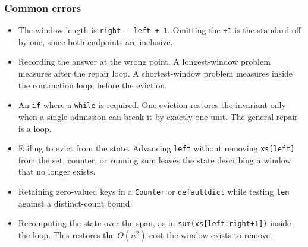 \vspace{-1ex}

\subsubsection*{Common errors}

\begin{itemize}[itemsep=-0.5ex]
  \item The window length is \texttt{right - left + 1}. Omitting the
        \texttt{+1} is the standard off-by-one, since both endpoints are
        inclusive.
  \item Recording the answer at the wrong point. A longest-window problem
        measures after the repair loop. A shortest-window problem measures
        inside the contraction loop, before the eviction.
  \item An \texttt{if} where a \texttt{while} is required. One eviction restores
        the invariant only when a single admission can break it by exactly one
        unit. The general repair is a loop.
  \item Failing to evict from the state. Advancing \texttt{left} without
        removing \texttt{xs[left]} from the set, counter, or running sum leaves
        the state describing a window that no longer exists.
  \item Retaining zero-valued keys in a \texttt{Counter} or
        \texttt{defaultdict} while testing \texttt{len} against a distinct-count
        bound.
  \item Recomputing the state over the span, as in \texttt{sum(xs[left:right+1])}
        inside the loop. This restores the $O(n^2)$ cost the window exists to
        remove.
\end{itemize}
